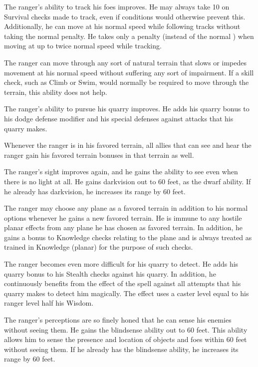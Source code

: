  The ranger's ability to track his foes improves. He may always take 10 on Survival checks made to track, even if conditions would otherwise prevent this. Additionally, he can move at his normal speed while following tracks without taking the normal  penalty. He takes only a  penalty (instead of the normal ) when moving at up to twice normal speed while tracking.

 The ranger can move through any sort of natural terrain that slows or impedes movement at his normal speed without suffering any sort of impairment. If a skill check, such as Climb or Swim, would normally be required to move through the terrain, this ability does not help.

 The ranger's ability to pursue his quarry improves. He adds his quarry bonus to his dodge defense modifier and his special defenses against attacks that his quarry makes.

 Whenever the ranger is in his favored terrain, all allies that can see and hear the ranger gain his favored terrain bonuses in that terrain as well.

 The ranger's sight improves again, and he gains the ability to see even when there is no light at all. He gains darkvision out to 60 feet, as the dwarf ability. If he already has darkvision, he increases its range by 60 feet.

 The ranger may choose any plane as a favored terrain in addition to his normal options whenever he gains a new favored terrain. He is immune to any hostile planar effects from any plane he has chosen as favored terrain. In addition, he gains a  bonus to Knowledge checks relating to the plane and is always treated as trained in Knowledge (planar) for the purpose of such checks.

 The ranger becomes even more difficult for his quarry to detect. He adds his quarry bonus to his Stealth checks against his quarry. In addition, he continuously benefits from the effect of the  spell against all attempts that his quarry makes to detect him magically. The effect uses a caster level equal to his ranger level \add half his Wisdom.

 The ranger's perceptions are so finely honed that he can sense his enemies without seeing them. He gains the blindsense ability out to 60 feet. This ability allows him to sense the presence and location of objects and foes within 60 feet without seeing them. If he already has the blindsense ability, he increases its range by 60 feet.

